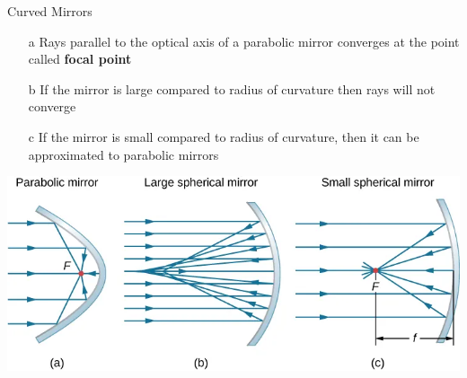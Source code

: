 \documentclass{beamer}
\begin{document}
\begin{frame}{Curved Mirrors }
	\begin{itemize}
		\item[a] Rays parallel to the optical axis of a parabolic mirror converges at the point called \textbf{focal point}
		\item[b] If the mirror is large compared to radius of curvature then rays will not converge
		\item[c] If the mirror is small compared to radius of curvature, then it can be approximated to parabolic mirrors
	\end{itemize}
	\begin{center}
		\includegraphics[scale=0.3]{41.png}
	\end{center}
\end{frame}
\end{document}
